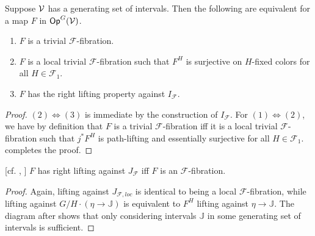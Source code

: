 \documentclass[a4paper,10pt
,draft
]{article}%
\renewcommand{\F}{\mathcal F}
\newcommand{\J}{\mathbb J}
\renewcommand{\1}{\eta}%
\begin{document}
\begin{lemma}
      \label{CAV_4.8}
      Suppose $\mathcal V$ has a generating set of intervals.
      Then the following are equivalent for a map $F$ in $\mathsf{Op}^G(\mathcal V)$.
      \begin{enumerate}[label = (\arabic*)]
      \item $F$ is a trivial $\F$-fibration.
      \item $F$ is a local trivial $\F$-fibration such that $F^H$ is surjective on $H$-fixed colors for all $H \in \F_1$.
      \item $F$ has the right lifting property against $I_{\F}$.
      \end{enumerate}
\end{lemma}
\begin{proof}
      $(2) \Leftrightarrow (3)$ is immediate by the construction of $I_{\F}$.
      For $(1) \Leftrightarrow (2)$, we have by definition that
      $F$ is a trivial $\F$-fibration
      iff
      it is a local trivial $\F$-fibration such that $j^*F^H$ is path-lifting and essentially surjective for all $H \in \F_1$.
      \cite[2.4]{BM13} completes the proof. 
\end{proof}

\begin{lemma}
      \label{CAV_4.3}
      [{cf. \cite[1.20]{CM13b}, \cite[\S 4.3]{Cav}}]
      $F$ has right lifting against $J_{\F}$ iff $F$ is an $\F$-fibration.
\end{lemma}
\begin{proof}
      Again, lifting against $J_{\F, loc}$ is identical to being a local $\F$-fibration, while lifting against $G/H \cdot (\1 \to \J)$
      is equivalent to $F^H$ lifting against $\1 \to \J$.
      The diagram after \cite[(4.3.2)]{Cav} shows that only considering intervals $\J$ in some generating set of intervals is sufficient.
\end{proof}
\end{document}
